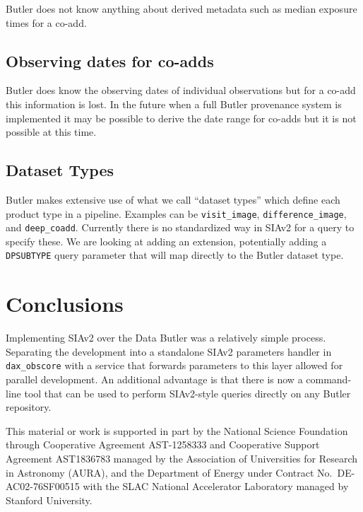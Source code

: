 \documentclass[11pt,twoside]{article}
\begin{document}
Butler does not know anything about derived metadata such as median exposure times for a co-add.

\subsection{Observing dates for co-adds}

Butler does know the observing dates of individual observations but for a co-add this information is lost.
In the future when a full Butler provenance system is implemented it may be possible to derive the date range for co-adds but it is not possible at this time.

\subsection{Dataset Types}

Butler makes extensive use of what we call ``dataset types'' which define each product type in a pipeline.
Examples can be \texttt{visit\_image}, \texttt{difference\_image}, and \texttt{deep\_coadd}.
Currently there is no standardized way in SIAv2 for a query to specify these.
We are looking at adding an extension, potentially adding a \texttt{DPSUBTYPE} query parameter that will map directly to the Butler dataset type.

\section{Conclusions}

Implementing SIAv2 over the Data Butler was a relatively simple process.
Separating the development into a standalone SIAv2 parameters handler in \texttt{dax\_obscore} with a service that forwards parameters to this layer allowed for parallel development.
An additional advantage is that there is now a command-line tool that can be used to perform SIAv2-style queries directly on any Butler repository.


\acknowledgments This material or work is supported in part by the National Science Foundation through Cooperative Agreement AST-1258333 and Cooperative Support Agreement AST1836783 managed by the Association of Universities for Research in Astronomy (AURA), and the Department of Energy under Contract No.\ DE-AC02-76SF00515 with the SLAC National Accelerator Laboratory managed by Stanford University.


\end{document}
